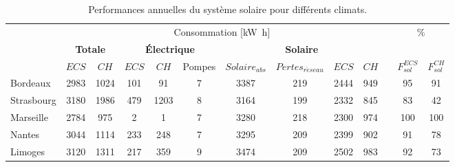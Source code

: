 \begin{table}
\small
\centering
\caption{Performances annuelles du système solaire pour différents climats.}
\label{tab:performance_annuelles}
\begin{tabular}{l c c c c c c c c c c c c}
    \toprule
               &   \multicolumn{9}{c}{Consommation [\si{\kilo\watt\hour}]} & & \multicolumn{2}{c}{\multirow{2}{*}{\%}} \\
    \cmidrule(r){2-10}
               & \multicolumn{2}{c}{\textbf{Totale}} &  \multicolumn{3}{c}{\textbf{Électrique}}  & \multicolumn{4}{c}{\textbf{Solaire}} & \\
    \cmidrule(r){2-3}
    \cmidrule(r){4-6}
    \cmidrule(r){7-10}
    \cmidrule(r){12-13}
               & $ECS$    & $CH$      &  $ECS$        & $CH$ & Pompes    & $Solaire_{abs}$  & $Pertes_{r\acute eseau}$ & $ECS$  & $CH$ & & $F_{sol}^{ECS}$  & $F_{sol}^{CH}$ \\
    \midrule
    Bordeaux   & \num{2983}     & \num{1024}      &  \num{101}          & \num{91}          &  \num{7}                 & \num{3387}                  & \num{219}       & \num{2444}   &  \num{949}    &   & \num{95}         & \num{91}  \\
    Strasbourg & \num{3180}     & \num{1986}      &  \num{479}          & \num{1203}        &  \num{8}                 & \num{3164}                  & \num{199}       & \num{2332}   &  \num{845}    &   & \num{83}         & \num{42}  \\
    Marseille  & \num{2784}     & \num{975}       &  \num{2}            & \num{1}           &  \num{7}                 & \num{3280}                  & \num{218}       & \num{2300}   &  \num{974}    &   & \num{100}        & \num{100} \\
    Nantes     & \num{3044}     & \num{1114}      &  \num{233}          & \num{248}         &  \num{7}                 & \num{3295}                  & \num{209}       & \num{2399}   &  \num{902}    &   & \num{91}         & \num{78}  \\
    Limoges    & \num{3120}     & \num{1311}      &  \num{217}          & \num{359}         &  \num{9}                 & \num{3474}                  & \num{209}       & \num{2502}   &  \num{983}    &   & \num{92}         & \num{73}  \\
    \bottomrule
\end{tabular}
\end{table}

